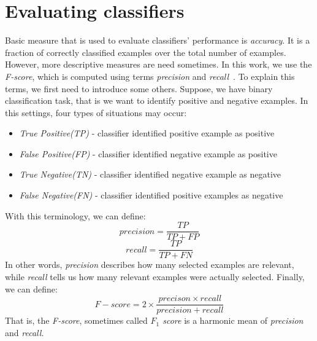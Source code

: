 \section{Evaluating classifiers}
Basic measure that is used to evaluate classifiers' performance is \textit{accuracy}.
It is a fraction of correctly classified examples over the total number of examples.
However, more descriptive measures are need sometimes.
In this work, we use the \textit{F-score}, which is computed using terms \textit{precision} and \textit{recall}~\cite{sokolova2006beyond}.
To explain this terms, we first need to introduce some others.
Suppose, we have binary classification task, that is we want to identify positive and negative examples.
In this settings, four types of situations may occur:
\begin{itemize}
\item \textit{True Positive(TP)} - classifier identified positive example as positive
\item \textit{False Positive(FP)} - classifier identified negative example as positive
\item \textit{True Negative(TN)} - classifier identified negative example as negative
\item \textit{False Negative(FN)} - classifier identified positive examples as negative
\end{itemize}
\par
With this terminology, we can define:
\begin{equation}
precision = \frac{TP}{TP + FP}
\end{equation}
\begin{equation}
recall = \frac{TP}{TP + FN}
\end{equation}
In other words, \textit{precision} describes how many selected examples are relevant, while \textit{recall} tells us how many relevant examples were actually selected.
Finally, we can define:
\begin{equation}
F-score = 2 \times \frac{precison \times recall}{precision + recall}
\end{equation}
That is, the \textit{F-score}, sometimes called \textit{$F_1$ score} is a harmonic mean of \textit{precision} and \textit{recall.}